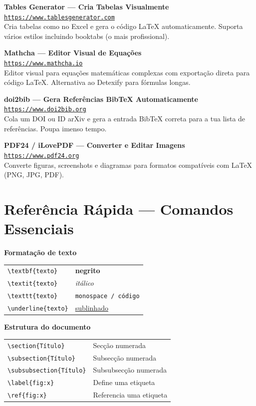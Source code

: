 \documentclass[12pt]{article}
\newcommand{\recurso}[3]{%
    \begin{mdframed}[style=resourcebox]
        \textbf{#1}\\[3pt]
        \href{#2}{\textcolor{linkblue}{\small\texttt{#2}}}\\[5pt]
        \small #3
    \end{mdframed}
}
\begin{document}
\recurso{Tables Generator — Cria Tabelas Visualmente}
    {https://www.tablesgenerator.com}
    {Cria tabelas como no Excel e gera o código LaTeX automaticamente.
     Suporta vários estilos incluindo booktabs (o mais profissional).}

\recurso{Mathcha — Editor Visual de Equações}
    {https://www.mathcha.io}
    {Editor visual para equações matemáticas complexas com exportação
     direta para código LaTeX. Alternativa ao Detexify para fórmulas longas.}

\recurso{doi2bib — Gera Referências BibTeX Automaticamente}
    {https://www.doi2bib.org}
    {Cola um DOI ou ID arXiv e gera a entrada BibTeX correta para
     a tua lista de referências. Poupa imenso tempo.}

\recurso{PDF24 / iLovePDF — Converter e Editar Imagens}
    {https://www.pdf24.org}
    {Converte figuras, screenshots e diagramas para formatos compatíveis
     com LaTeX (PNG, JPG, PDF).}

\newpage

\section{Referência Rápida — Comandos Essenciais}

\begin{mdframed}[style=resourcebox]
\textbf{Formatação de texto}\\[6pt]
\begin{tabular}{@{}ll@{}}
\texttt{\textbackslash textbf\{texto\}}    & \textbf{negrito}              \\
\texttt{\textbackslash textit\{texto\}}    & \textit{itálico}              \\
\texttt{\textbackslash texttt\{texto\}}    & \texttt{monospace / código}   \\
\texttt{\textbackslash underline\{texto\}} & \underline{sublinhado}        \\
\end{tabular}
\end{mdframed}

\begin{mdframed}[style=resourcebox]
\textbf{Estrutura do documento}\\[6pt]
\begin{tabular}{@{}ll@{}}
\texttt{\textbackslash section\{Título\}}       & Secção numerada           \\
\texttt{\textbackslash subsection\{Título\}}    & Subsecção numerada        \\
\texttt{\textbackslash subsubsection\{Título\}} & Subsubsecção numerada     \\
\texttt{\textbackslash label\{fig:x\}}          & Define uma etiqueta       \\
\texttt{\textbackslash ref\{fig:x\}}            & Referencia uma etiqueta   \\
\end{tabular}
\end{mdframed}
\end{document}
